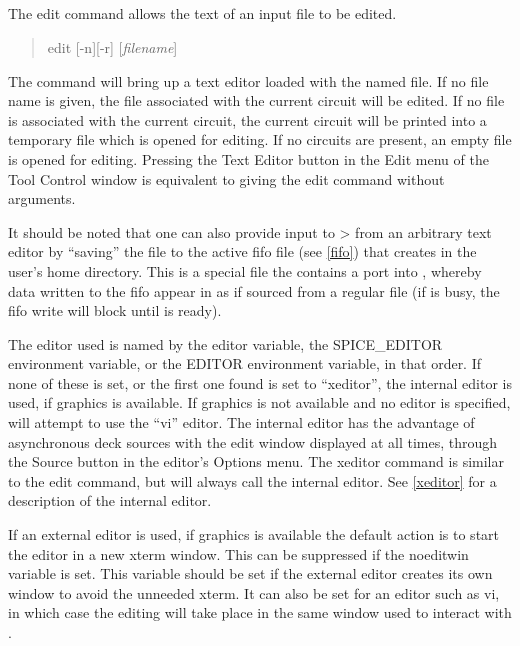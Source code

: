 \subsection{}


The {\cb edit} command allows the text of an input file to be edited.
\begin{quote}\vt
edit [-n][-r] [{\it filename\/}]
\end{quote}
The command will bring up a text editor loaded with the named file. 
If no file name is given, the file associated with the current circuit
will be edited.  If no file is associated with the current circuit,
the current circuit will be printed into a temporary file which is
opened for editing.  If no circuits are present, an empty file is
opened for editing.  Pressing the {\cb Text Editor} button in the {\cb
Edit} menu of the {\cb Tool Control} window is equivalent to giving
the {\cb edit} command without arguments.

It should be noted that one can also provide input to {\WRspice}> from
an arbitrary text editor by ``saving'' the file to the active fifo
file (see \ref{fifo}) that {\WRspice} creates in the user's home
directory.  This is a special file the contains a port into
{\WRspice}, whereby data written to the fifo appear in {\WRspice} as
if sourced from a regular file (if {\WRspice} is busy, the fifo write
will block until {\WRspice} is ready).

The editor used is named by the {\et editor} variable, the {\et
SPICE\_EDITOR} environment variable, or the {\et EDITOR} environment
variable, in that order.  If none of these is set, or the first one
found is set to ``{\vt xeditor}'', the internal editor is used, if
graphics is available.  If graphics is not available and no editor is
specified, {\WRspice} will attempt to use the ``{\vt vi}'' editor. 
The internal editor has the advantage of asynchronous deck sources
with the edit window displayed at all times, through the {\cb Source}
button in the editor's {\cb Options} menu.  The {\cb xeditor} command
is similar to the {\cb edit} command, but will always call the
internal editor.  See \ref{xeditor} for a description of the internal
editor.

If an external editor is used, if graphics is available the default
action is to start the editor in a new {\vt xterm} window.  This can
be suppressed if the {\et noeditwin} variable is set.  This variable
should be set if the external editor creates its own window to avoid
the unneeded {\vt xterm}.  It can also be set for an editor such as
{\vt vi}, in which case the editing will take place in the same window
used to interact with {\WRspice}.

